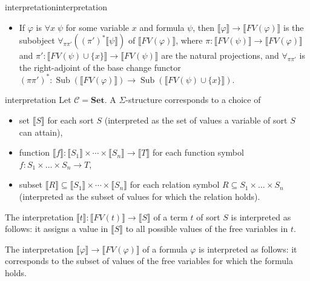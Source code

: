 \begin{topic}{interpretation}{interpretation}
\begin{itemize}
        \item If $\varphi$ is $\forall x \; \psi$ for some variable $x$ and formula $\psi$, then $\llbracket \varphi \rrbracket \to \llbracket FV(\varphi) \rrbracket$ is the subobject $\forall_{\pi \pi'} ((\pi')^* \llbracket \psi \rrbracket)$ of $\llbracket FV(\varphi) \rrbracket$, where $\pi \colon \llbracket FV(\psi) \rrbracket \to \llbracket FV(\varphi) \rrbracket$ and $\pi' \colon \llbracket FV(\psi) \cup \{ x \} \rrbracket \to \llbracket FV(\psi) \rrbracket$ are the natural projections, and $\forall_{\pi \pi'}$ is the right-adjoint of the base change functor $(\pi \pi')^* \colon \operatorname{Sub}(\llbracket FV(\varphi) \rrbracket) \to \operatorname{Sub}(\llbracket FV(\psi) \cup \{ x \} \rrbracket)$.
    \end{itemize}
\end{topic}

\begin{example}{interpretation}
    Let $\mathcal{C} = \textbf{Set}$. A $\Sigma$-structure corresponds to a choice of
    \begin{itemize}
        \item set $\llbracket S \rrbracket$ for each sort $S$ (interpreted as the set of values a variable of sort $S$ can attain),
        \item function $\llbracket f \rrbracket \colon \llbracket S_1 \rrbracket \times \cdots \times \llbracket S_n \rrbracket \to \llbracket T \rrbracket$ for each function symbol $f \colon S_1 \times \ldots \times S_n \to T$,
        \item subset $\llbracket R \rrbracket \subseteq \llbracket S_1 \rrbracket \times \cdots \times \llbracket S_n \rrbracket$ for each relation symbol $R \subseteq S_1 \times \ldots \times S_n$ (interpreted as the subset of values for which the relation holds).
    \end{itemize}
    The interpretation $\llbracket t \rrbracket \colon \llbracket FV(t) \rrbracket \to \llbracket S \rrbracket$ of a term $t$ of sort $S$ is interpreted as follows: it assigns a value in $\llbracket S \rrbracket$ to all possible values of the free variables in $t$.

    The interpretation $\llbracket \varphi \rrbracket \to \llbracket FV(\varphi) \rrbracket$ of a formula $\varphi$ is interpreted as follows: it corresponds to the subset of values of the free variables for which the formula holds.
\end{example}

